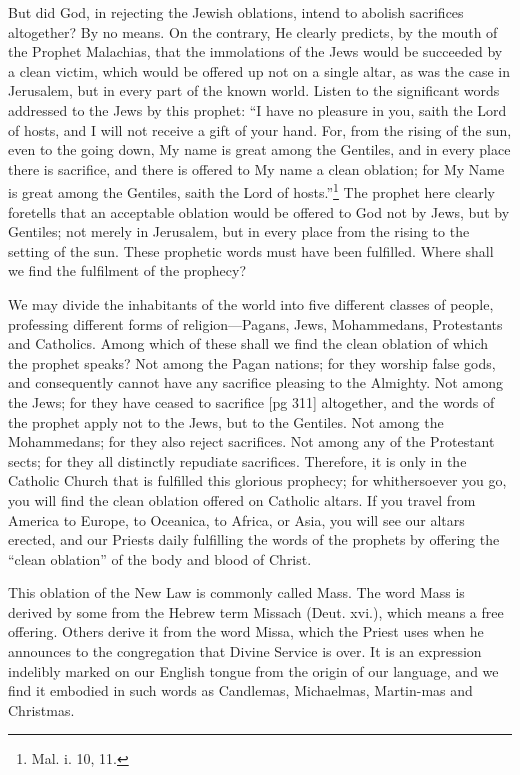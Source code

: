 But did God, in rejecting the Jewish oblations,
intend to abolish sacrifices altogether? By no
means. On the contrary, He clearly predicts, by
the mouth of the Prophet Malachias, that the immolations
of the Jews would be succeeded by a
clean victim, which would be offered up not on a
single altar, as was the case in Jerusalem, but in
every part of the known world. Listen to the significant
words addressed to the Jews by this
prophet: “I have no pleasure in you, saith the
Lord of hosts, and I will not receive a gift of your
hand. For, from the rising of the sun, even to the
going down, My name is great among the Gentiles,
and in every place there is sacrifice, and there is
offered to My name a clean oblation; for My Name
is great among the Gentiles, saith the Lord of
hosts.”\footnote{Mal. i. 10,
11.} The prophet here clearly foretells that
an acceptable oblation would be offered to God not
by Jews, but by Gentiles; not merely in Jerusalem,
but in every place from the rising to the
setting of the sun. These prophetic words must
have been fulfilled. Where shall we find the fulfilment
of the prophecy?

We may divide the inhabitants of the world into
five different classes of people, professing different
forms of religion—Pagans, Jews, Mohammedans,
Protestants and Catholics. Among which of
these shall we find the clean oblation of which the
prophet speaks? Not among the Pagan nations;
for they worship false gods, and consequently cannot
have any sacrifice pleasing to the Almighty.
Not among the Jews; for they have ceased to sacrifice
[pg 311]
altogether, and the words of the prophet
apply not to the Jews, but to the Gentiles. Not
among the Mohammedans; for they also reject sacrifices.
Not among any of the Protestant sects; for
they all distinctly repudiate sacrifices. Therefore,
it is only in the Catholic Church that is fulfilled
this glorious prophecy; for whithersoever you go,
you will find the clean oblation offered on Catholic
altars. If you travel from America to Europe, to
Oceanica, to Africa, or Asia, you will see our
altars erected, and our Priests daily fulfilling the
words of the prophets by offering the “clean
oblation” of the body and blood of Christ.

This oblation of the New Law is commonly
called Mass. The word Mass is derived by some
from the Hebrew term Missach (Deut. xvi.), which
means a free offering. Others derive it from the
word Missa, which the Priest uses when he announces
to the congregation that Divine Service is
over. It is an expression indelibly marked on our
English tongue from the origin of our language,
and we find it embodied in such words as Candlemas,
Michaelmas, Martin-mas
and Christmas.


